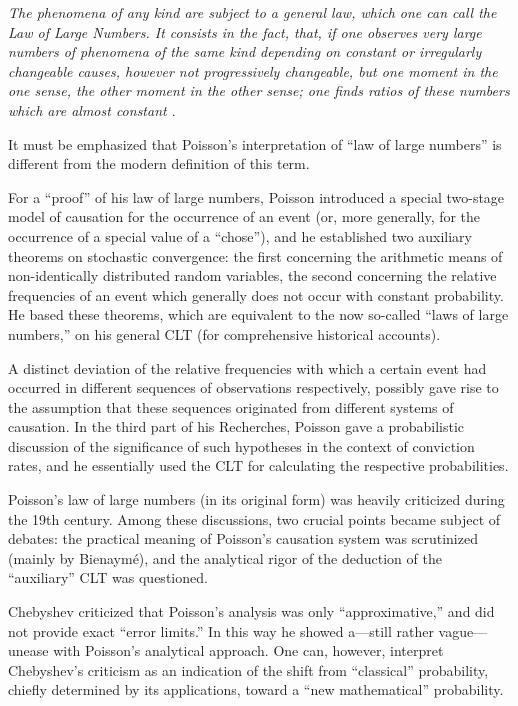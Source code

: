 \documentclass{article}
\begin{document}
\textit{The phenomena of any kind are subject to a general law, which one can call the Law of Large Numbers. 
It consists in the fact, that, if one observes very large numbers of phenomena of the same kind depending on constant or irregularly changeable causes, however not
progressively changeable, but one moment in the one sense, the other moment in the other sense; one finds ratios of these numbers which are almost constant \cite{Fischer2010History}}.

It must be emphasized that Poisson’s interpretation of “law of large numbers” is
different from the modern definition of this term.

For a “proof” of his law of large numbers, Poisson introduced a special two-stage model of causation for the occurrence of an event
(or, more generally, for the occurrence of a special value of a “chose”), and he established two auxiliary theorems on stochastic convergence: 
the first concerning the arithmetic means of non-identically distributed random variables, the second concerning the relative frequencies of an event which generally does not occur with constant probability. 
He based these theorems, which are equivalent to the now so-called “laws of large numbers,” on his general CLT (for comprehensive historical accounts).

A distinct deviation of the relative frequencies with which a certain event had occurred in different sequences of observations respectively, possibly gave rise to the assumption that these sequences originated from different systems of causation. In the third part of his Recherches, Poisson gave a probabilistic discussion of the significance of such hypotheses in the context of conviction rates, and he essentially used the CLT for calculating the respective probabilities.

Poisson’s law of large numbers (in its original form) was heavily criticized during the 19th century. Among these discussions, two crucial points became subject of debates: the practical meaning of Poisson’s causation system was scrutinized (mainly by Bienaymé), and the analytical rigor of the deduction of the “auxiliary” CLT was questioned.

Chebyshev \cite{Remez1962General} criticized that Poisson’s analysis was only “approximative,”
and did not provide exact “error limits.”
In this way he showed a—still rather vague—unease with Poisson’s analytical approach. 
One can, however, interpret Chebyshev’s criticism as an indication of the shift from “classical” probability, chiefly determined by its applications, toward a “new mathematical” probability.
\end{document}
